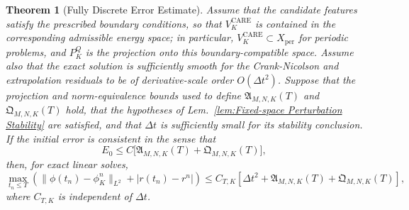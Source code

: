 \documentclass[10pt,reqno]{amsart}
\newtheorem{thm}{\bf Theorem}
\newenvironment{theorem}{\begin{thm}} {\end{thm}}
\theoremstyle{remark}
\theoremstyle{definition}
\begin{document}
\begin{theorem}[Fully Discrete Error Estimate]
  \label{thm:fully-discrete-error-estimate}
  Assume that the candidate features satisfy the prescribed boundary conditions, so that $V_K^{\mathrm{CARE}}$ is contained in the corresponding admissible energy space; in particular, $V_K^{\mathrm{CARE}}\subset X_{\mathrm{per}}$ for periodic problems, and $P_K^Q$ is the projection onto this boundary-compatible space. Assume also that the exact solution is sufficiently smooth for the Crank-Nicolson and extrapolation residuals to be of derivative-scale order $O(\Delta t^2)$. Suppose that the projection and norm-equivalence bounds used to define $\mathfrak A_{M,N,K}(T)$ and $\mathfrak Q_{M,N,K}(T)$ hold, that the hypotheses of Lem.~\ref{lem:Fixed-space Perturbation Stability} are satisfied, and that $\Delta t$ is sufficiently small for its stability conclusion. If the initial error is consistent in the sense that
  \begin{equation}
    E_0\leq C\bigl[\mathfrak A_{M,N,K}(T)+\mathfrak Q_{M,N,K}(T)\bigr],
    \label{eq:initial-consistency}
  \end{equation}
  then, for exact linear solves,
  \begin{equation}
    \max_{t_n\leq T}\left(\|\phi(t_n)-\phi_K^n\|_{L^2}+|r(t_n)-r^n|\right)
    \leq C_{T,K}\left[\Delta t^2+\mathfrak A_{M,N,K}(T)+\mathfrak Q_{M,N,K}(T)\right],
    \label{eq:fully-discrete-error-estimate}
  \end{equation}
  where $C_{T,K}$ is independent of $\Delta t$.
\end{theorem}
\end{document}
